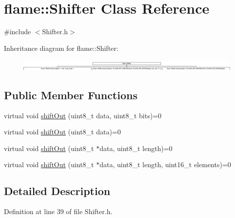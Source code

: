 \hypertarget{classflame_1_1_shifter}{\section{flame\-:\-:Shifter Class Reference}
\label{classflame_1_1_shifter}
}


{\ttfamily \#include $<$Shifter.\-h$>$}

Inheritance diagram for flame\-:\-:Shifter\-:\begin{figure}[H]
\begin{center}
\leavevmode
\includegraphics[height=0.624303cm]{classflame_1_1_shifter}
\end{center}
\end{figure}
\subsection*{Public Member Functions}
\begin{DoxyCompactItemize}
\item 
virtual void \hyperlink{classflame_1_1_shifter_ae41737bf06c0c10f4c41ed380bb3f309}{shift\-Out} (uint8\-\_\-t data, uint8\-\_\-t bits)=0
\item 
virtual void \hyperlink{classflame_1_1_shifter_a6309a7c637bbf0f697af638401c1bed4}{shift\-Out} (uint8\-\_\-t data)=0
\item 
virtual void \hyperlink{classflame_1_1_shifter_ae951cbfbe738a62503f906b403e21273}{shift\-Out} (uint8\-\_\-t $\ast$data, uint8\-\_\-t length)=0
\item 
virtual void \hyperlink{classflame_1_1_shifter_a337d5a3460ca61d79e8273e26549b63e}{shift\-Out} (uint8\-\_\-t $\ast$data, uint8\-\_\-t length, uint16\-\_\-t elements)=0
\end{DoxyCompactItemize}


\subsection{Detailed Description}


Definition at line 39 of file Shifter.\-h.



